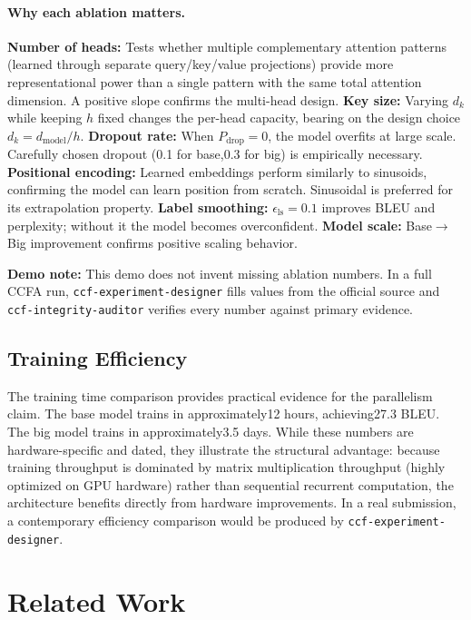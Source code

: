 ﻿\documentclass{article}
\begin{document}
\paragraph{Why each ablation matters.}
\textbf{Number of heads:} Tests whether multiple complementary attention patterns (learned through separate query/key/value projections) provide more representational power than a single pattern with the same total attention dimension. A positive slope confirms the multi-head design.
\textbf{Key size:} Varying $d_k$ while keeping $h$ fixed changes the per-head capacity, bearing on the design choice $d_k = d_{\text{model}}/h$.
\textbf{Dropout rate:} When $P_{\text{drop}}=0$, the model overfits at large scale. Carefully chosen dropout (0.1 for base,0.3 for big) is empirically necessary.
\textbf{Positional encoding:} Learned embeddings perform similarly to sinusoids, confirming the model can learn position from scratch. Sinusoidal is preferred for its extrapolation property.
\textbf{Label smoothing:} $\epsilon_{\text{ls}}=0.1$ improves BLEU and perplexity; without it the model becomes overconfident.
\textbf{Model scale:} Base$\to$Big improvement confirms positive scaling behavior.

\textbf{Demo note:} This demo does not invent missing ablation numbers. In a full CCFA run, \texttt{ccf-experiment-designer} fills values from the official source and \texttt{ccf-integrity-auditor} verifies every number against primary evidence.

\subsection{Training Efficiency}

The training time comparison provides practical evidence for the parallelism claim. The base model trains in approximately12 hours, achieving27.3 BLEU. The big model trains in approximately3.5 days. While these numbers are hardware-specific and dated, they illustrate the structural advantage: because training throughput is dominated by matrix multiplication throughput (highly optimized on GPU hardware) rather than sequential recurrent computation, the architecture benefits directly from hardware improvements. In a real submission, a contemporary efficiency comparison would be produced by \texttt{ccf-experiment-designer}.


\section{Related Work}
\end{document}
